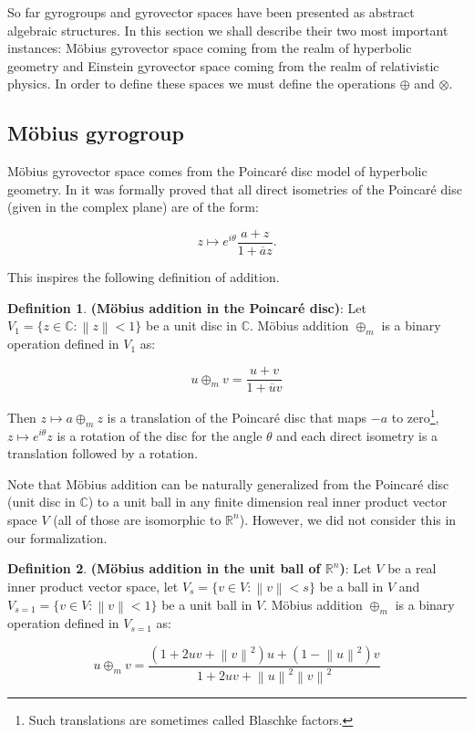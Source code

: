 \documentclass[a4paper]{article}
\theoremstyle{definition}
\newtheorem{definition}{Definition}[section]
\newcommand{\norm}[1]{\left\lVert#1\right\rVert}
\begin{document}
So far gyrogroups and gyrovector spaces have been presented as
abstract algebraic structures. In this section we shall describe their
two most important instances: M\"obius gyrovector space coming from
the realm of hyperbolic geometry and Einstein gyrovector space coming
from the realm of relativistic physics. In order to define these
spaces we must define the operations $\oplus$ and $\otimes$.


\subsection{M\"obius gyrogroup}

M\"obius gyrovector space comes from the Poincar\'e disc model of
hyperbolic geometry. In \cite{amai-poincare} it was formally proved
that all direct isometries of the Poincar\'e disc (given in the
complex plane) are of the form:

$$z \mapsto e^{i\theta} \frac{a+z}{1+\overline{a}z}.$$

This inspires the following definition of addition.

\begin{definition}\textbf{(M\" obius addition in the Poincar\'e disc)}: Let 
  $V_1 = \{z\in \mathbb{C}: \norm{z} < 1\}$ be a unit disc in
  $\mathbb{C}$. M\" obius addition $\oplus_m$ is a binary operation
  defined in $V_1$ as:
  
  $$u\oplus_m v = \frac{u+v}{1+\overline{u}v}$$
\end{definition}

Then $z \mapsto a \oplus_m z$ is a translation of the Poincar\'e disc
that maps $-a$ to zero\footnote{Such translations are sometimes called
  Blaschke factors.}, $z \mapsto e^{i\theta}z$ is a rotation of the
disc for the angle $\theta$ and each direct isometry is a translation
followed by a rotation.

Note that M\"obius addition can be naturally generalized from the
Poincar\'e disc (unit disc in $\mathbb{C}$) to a unit ball in any
finite dimension real inner product vector space $V$ (all of those
are isomorphic to $\mathbb{R}^n$). However, we did not consider this
in our formalization.

\begin{definition}\textbf{(M\" obius addition in the unit ball of $\mathbb{R}^n$)}: Let $V$
  be a real inner product vector space, let
  $V_{s} = \{v\in V: \norm{v}<s\}$ be a ball in $V$ and
  $V_{s=1} = \{v\in V: \norm{v}<1\}$ be a unit ball in $V$. M\" obius
  addition $\oplus_m$ is a binary operation defined in $V_{s=1}$ as:
  
$$u \oplus_m v = \frac{(1+2uv+\norm{v}^2)u+(1-\norm{u}^2)v}{1+2uv+\norm{u}^2\norm{v}^2}$$ 
\end{definition}
\end{document}
